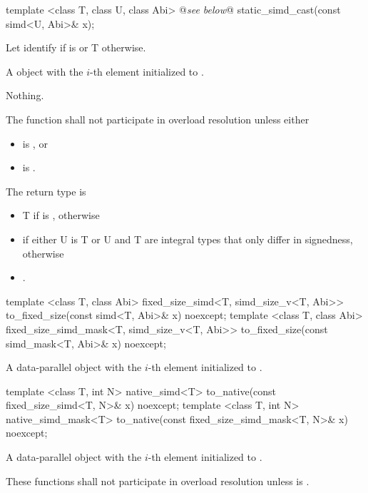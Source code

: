 \begin{itemdecl}
template <class T, class U, class Abi> @\emph{see below}@ static_simd_cast(const simd<U, Abi>& x);
\end{itemdecl}
\begin{itemdescr}
  \pnum Let  identify  if  is \true or \type T otherwise.

  \pnum\returns A \simd object with the $i$-th element initialized to  \foralli.

  \pnum\throws Nothing.

  \pnum\remarks The function shall not participate in overload resolution unless either
  \begin{itemize}
    \item {} is \false, or
    \item {} is \true.
  \end{itemize}

  \pnum
  The return type is
  \begin{itemize}
    \item \type T if  is \true, otherwise
    \item \simd[<T, Abi>] if either \type U is \type T or \type U and \type T are integral types that only differ in signedness, otherwise
    \item {}.
  \end{itemize}
\end{itemdescr}

\begin{itemdecl}
template <class T, class Abi>
fixed_size_simd<T, simd_size_v<T, Abi>> to_fixed_size(const simd<T, Abi>& x) noexcept;
template <class T, class Abi>
fixed_size_simd_mask<T, simd_size_v<T, Abi>> to_fixed_size(const simd_mask<T, Abi>& x) noexcept;
\end{itemdecl}
\begin{itemdescr}
  \pnum\returns A data-parallel object with the $i$-th element initialized to  \foralli.
\end{itemdescr}

\begin{itemdecl}
template <class T, int N> native_simd<T> to_native(const fixed_size_simd<T, N>& x) noexcept;
template <class T, int N> native_simd_mask<T> to_native(const fixed_size_simd_mask<T, N>& x) noexcept;
\end{itemdecl}
\begin{itemdescr}
  \pnum\returns A data-parallel object with the $i$-th element initialized to  \foralli.

  \pnum\remarks These functions shall not participate in overload resolution unless  is \true.
\end{itemdescr}


